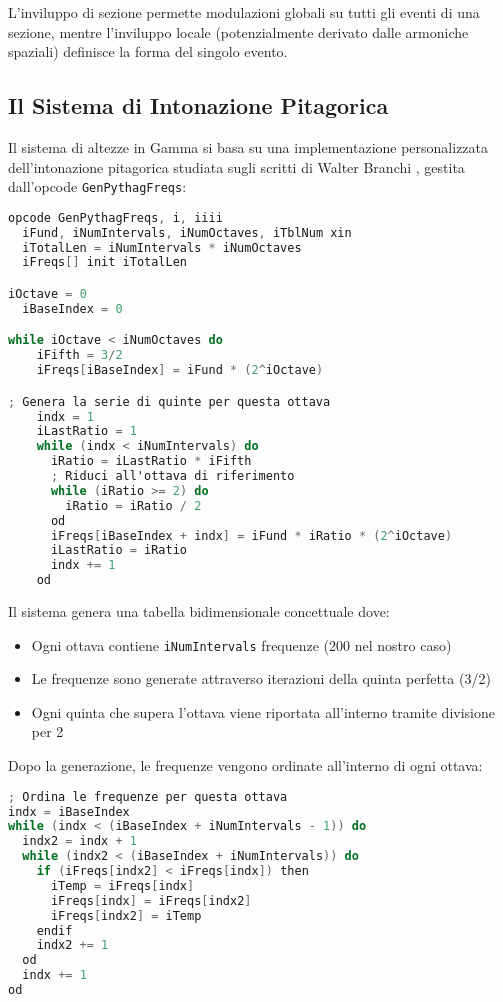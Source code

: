 L'inviluppo di sezione permette modulazioni globali su tutti gli eventi di una sezione, mentre l'inviluppo locale (potenzialmente derivato dalle armoniche spaziali) definisce la forma del singolo evento.
\subsection{Il Sistema di Intonazione Pitagorica}
Il sistema di altezze in Gamma si basa su una implementazione personalizzata dell'intonazione pitagorica studiata sugli scritti di Walter Branchi \cite{Branchi1987}, gestita dall'opcode \texttt{GenPythagFreqs}:

\begin{lstlisting}[language=C]
opcode GenPythagFreqs, i, iiii
  iFund, iNumIntervals, iNumOctaves, iTblNum xin
  iTotalLen = iNumIntervals * iNumOctaves
  iFreqs[] init iTotalLen

iOctave = 0
  iBaseIndex = 0

while iOctave < iNumOctaves do
    iFifth = 3/2
    iFreqs[iBaseIndex] = iFund * (2^iOctave)

; Genera la serie di quinte per questa ottava
    indx = 1
    iLastRatio = 1
    while (indx < iNumIntervals) do
      iRatio = iLastRatio * iFifth
      ; Riduci all'ottava di riferimento
      while (iRatio >= 2) do
        iRatio = iRatio / 2
      od
      iFreqs[iBaseIndex + indx] = iFund * iRatio * (2^iOctave)
      iLastRatio = iRatio
      indx += 1
    od
\end{lstlisting}

Il sistema genera una tabella bidimensionale concettuale dove:
\begin{itemize}
 \item Ogni ottava contiene \texttt{iNumIntervals} frequenze (200 nel nostro caso)
 \item Le frequenze sono generate attraverso iterazioni della quinta perfetta (3/2)
 \item Ogni quinta che supera l'ottava viene riportata all'interno tramite divisione per 2
\end{itemize}

Dopo la generazione, le frequenze vengono ordinate all'interno di ogni ottava:

\begin{lstlisting}[language=C]
; Ordina le frequenze per questa ottava
indx = iBaseIndex
while (indx < (iBaseIndex + iNumIntervals - 1)) do
  indx2 = indx + 1
  while (indx2 < (iBaseIndex + iNumIntervals)) do
    if (iFreqs[indx2] < iFreqs[indx]) then
      iTemp = iFreqs[indx]
      iFreqs[indx] = iFreqs[indx2]
      iFreqs[indx2] = iTemp
    endif
    indx2 += 1
  od
  indx += 1
od
\end{lstlisting}

